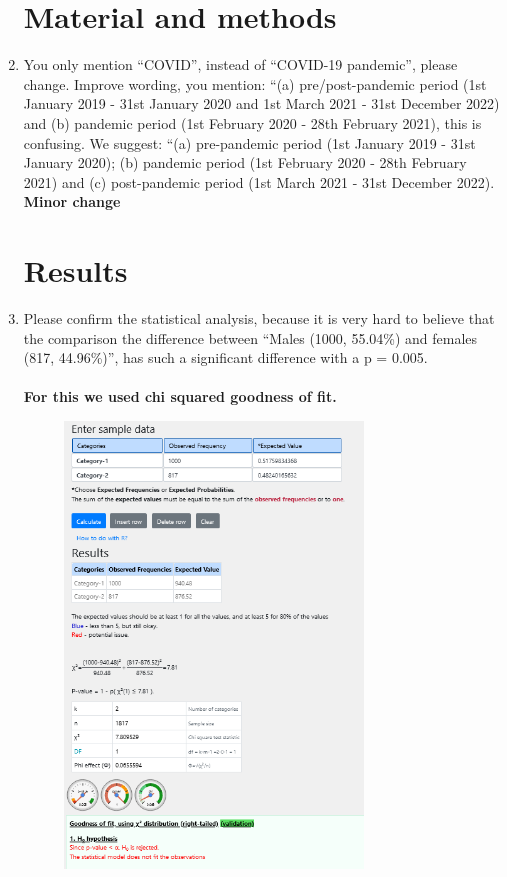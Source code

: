 \documentclass[a4paper]{article}
\begin{document}
\begin{enumerate}
    \section{ Material and methods }
    \item You only mention “COVID”, instead of “COVID-19 pandemic”, please change. Improve wording, you mention: “(a) pre/post-pandemic period (1st January 2019 - 31st January 2020 and 1st March 2021 - 31st December 2022) and (b)
    pandemic period (1st February 2020 - 28th February 2021), this is confusing. We suggest: “(a) pre-pandemic period (1st January 2019 - 31st January 2020); (b) pandemic period (1st February 2020 - 28th February 2021) and (c) post-pandemic period (1st March 2021 - 31st December 2022).\\
    \textbf{Minor change}
    \section{Results}
    \item Please confirm the statistical analysis, because it is very hard to believe that the comparison the difference between “Males (1000, 55.04\%) and females (817, 44.96\%)”, has such a significant difference with a p = 0.005. \\\\
    \textbf{For this we used chi squared goodness of fit. }
    \begin{figure}[H]
        \begin{center}
            \includegraphics[width=0.75\textwidth]{proof.png}

\end{center}
\end{figure}
\end{enumerate}
\end{document}
